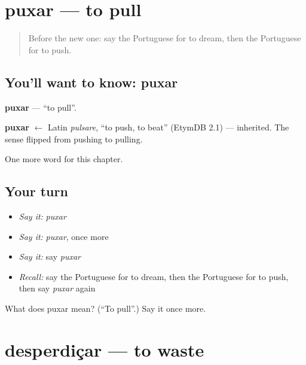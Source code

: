 \section[puxar]{puxar — to pull}

\label{lesson:PT-C236-puxar}



\begin{quote}
Before the new one: say the Portuguese for to dream, then the Portuguese for to push.
\end{quote}

\subsection*{You'll want to know: puxar}
\textbf{puxar} — \textquotedblleft{}to pull\textquotedblright{}.

\begin{cousinweb}
\textbf{puxar} $\leftarrow$ Latin \emph{pulsare}, \textquotedblleft{}to push, to beat\textquotedblright{} (EtymDB 2.1) — inherited. The sense flipped from pushing to pulling.
\end{cousinweb}

\begin{grammarlens}[title={What you've built}]
One more word for this chapter.
\end{grammarlens}

\subsection*{Your turn}
\begin{itemize}
\raggedright
  \item \emph{Say it:} \emph{puxar}
  \item \emph{Say it:} \emph{puxar}, once more
  \item \emph{Say it:} say \emph{puxar}
  \item \emph{Recall:} say the Portuguese for to dream, then the Portuguese for to push, then say \emph{puxar} again
\end{itemize}

\begin{tcolorbox}[breakable,colback=teal!4,colframe=teal!35!black,title={Before you move on}]
What does puxar mean? (\textquotedblleft{}To pull\textquotedblright{}.) Say it once more.
\end{tcolorbox}
\section[desperdiçar]{desperdiçar — to waste}

